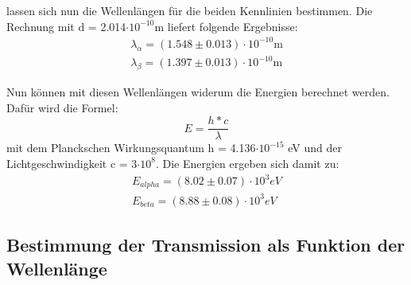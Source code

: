 \noindent lassen sich nun die Wellenlängen für die beiden Kennlinien bestimmen. Die Rechnung mit d = 2.014$\cdot 10^{-10}$m liefert folgende Ergebnisse:
\begin{align}
    \lambda_{\alpha} = (1.548 \pm 0.013) \cdot 10^{-10} \text{m} \nonumber \\
    \lambda_{\beta} = (1.397 \pm 0.013) \cdot 10^{-10} \text{m} \nonumber
\end{align}

Nun können mit diesen Wellenlängen widerum die Energien berechnet werden. Dafür wird die Formel:
\begin{displaymath}
    E = \frac{h*c}{\lambda} 
\end{displaymath}
mit dem Planckschen Wirkungsquantum h = 4.136$\cdot 10^{-15}$ eV und der Lichtgeschwindigkeit c = 3$\cdot 10^{8}$. Die Energien ergeben sich damit zu:
\begin{align}
    E_{alpha} = (8.02 \pm 0.07) \cdot 10^{3} eV \nonumber \\
    E_{beta} = (8.88 \pm 0.08) \cdot 10^{3} eV \nonumber
\end{align}

\subsection{Bestimmung der Transmission als Funktion der Wellenlänge}

